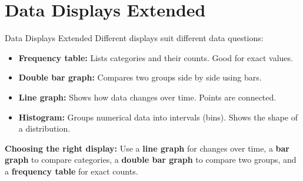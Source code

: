 \section{Data Displays Extended}

\begin{quickReview}{Data Displays Extended}
Different displays suit different data questions:

\begin{itemize}[leftmargin=*]
    \item \textbf{Frequency table:} Lists categories and their counts. Good for exact values.
    \item \textbf{Double bar graph:} Compares two groups side by side using bars.
    \item \textbf{Line graph:} Shows how data changes over time. Points are connected.
    \item \textbf{Histogram:} Groups numerical data into intervals (bins). Shows the shape of a distribution.
\end{itemize}

\medskip
\textbf{Choosing the right display:}
Use a \textbf{line graph} for changes over time, a \textbf{bar graph} to compare categories, a \textbf{double bar graph} to compare two groups, and a \textbf{frequency table} for exact counts.
\end{quickReview}

